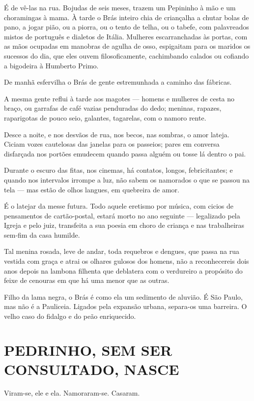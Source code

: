É de vê-las na rua. Bojudas de seis meses, trazem um Pepininho à mão e
um choramingas à mama. À tarde o Brás inteiro chia de criançalha a
chutar bolas de pano, a jogar pião, ou a piorra, ou o tento de telha, ou
o tabefe, com palavreados mistos de português e dialetos de Itália.
Mulheres escarranchadas às portas, com as mãos ocupadas em manobras de
agulha de osso, espigaitam para os maridos os sucessos do dia, que eles
ouvem filosoficamente, cachimbando calados ou cofiando a bigodeira à
Humberto Primo.

De manhã esfervilha o Brás de gente estremunhada a caminho das fábricas.

A mesma gente reflui à tarde aos magotes --- homens e mulheres de cesta
no braço, ou garrafas de café vazias penduradas do dedo; meninas,
rapazes, raparigotas de pouco seio, galantes, tagarelas, com o namoro
rente.

Desce a noite, e nos desvãos de rua, nos becos, nas sombras, o amor
lateja. Ciciam vozes cautelosas das janelas para os passeios; pares em
conversa disfarçada nos portões emudecem quando passa alguém ou tosse lá
dentro o pai.

Durante o escuro das fitas, nos cinemas, há contatos, longos,
febricitantes; e quando nos intervalos irrompe a luz, não sabem os
namorados o que se passou na tela --- mas estão de olhos langues, em
quebreira de amor.

É o latejar da messe futura. Todo aquele eretismo por música, com cicios
de pensamentos de cartão-postal, estará morto no ano seguinte ---
legalizado pela Igreja e pelo juiz, transfeita a sua poesia em choro de
criança e nas trabalheiras sem-fim da casa humilde.

Tal menina rosada, leve de andar, toda requebros e dengues, que passa na
rua vestida com graça e atrai os olhares gulosos dos homens, não a
reconhecereis dois anos depois na lambona filhenta que deblatera com o
verdureiro a propósito do feixe de cenouras em que há uma menor que as
outras.

Filho da lama negra, o Brás é como ela um sedimento de aluvião. É São
Paulo, mas não é a Pauliceia. Ligados pela expansão urbana, separa-os
uma barreira. O velho caso do fidalgo e do peão enriquecido.

\section{PEDRINHO, SEM SER CONSULTADO, NASCE}

Viram-se, ele e ela. Namoraram-se. Casaram.

